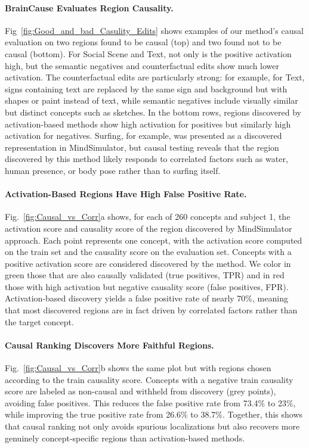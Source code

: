 \documentclass{article}
\begin{document}



\vspace{-0.15cm}
\paragraph{BrainCause Evaluates Region Causality.}
Fig~\ref{fig:Good_and_bad_Casulity_Edits} shows examples of our method's causal evaluation on two regions found to be causal (top) and two found not to be causal (bottom). For Social Scene and Text, not only is the positive activation high, but the semantic negatives and counterfactual edits show much lower activation. The counterfactual edits are particularly strong: for example, for Text, signs containing text are replaced by the same sign and background but with shapes or paint instead of text, while semantic negatives include visually similar but distinct concepts such as sketches. In the bottom rows, regions discovered by activation-based methods show high activation for positives but similarly high activation for negatives. Surfing, for example, was presented as a discovered representation in MindSimulator, but causal testing reveals that the region discovered by this method likely responds to correlated factors such as water, human presence, or body pose rather than to surfing itself.

\vspace{-0.15cm}
\paragraph{Activation-Based Regions Have High False Positive Rate.}
Fig.~\ref{fig:Causal_vs_Corr}a shows, for each of 260 concepts and subject 1, the activation score and causality score of the region discovered by MindSimulator approach. Each point represents one concept, with the activation score computed on the train set and the causality score on the evaluation set. Concepts with a positive activation score are considered discovered by the method. We color in green those that are also causally validated (true positives, TPR) and in red those with high activation but negative causality score (false positives, FPR). Activation-based discovery yields a false positive rate of nearly 70\%, meaning that most discovered regions are in fact driven by correlated factors rather than the target concept.

\vspace{-0.15cm}
\paragraph{Causal Ranking Discovers More Faithful Regions.}
Fig.~\ref{fig:Causal_vs_Corr}b shows the same plot but with regions chosen according to the train causality score. Concepts with a negative train causality score are labeled as non-causal and withheld from discovery (grey points), avoiding false positives. This reduces the false positive rate from 73.4\% to 23\%, while improving the true positive rate from 26.6\% to 38.7\%. Together, this shows that causal ranking not only avoids spurious localizations but also recovers more genuinely concept-specific regions than activation-based methods.
\end{document}
